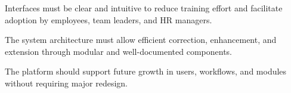   \vspace{6pt}


  {\fontsize{12}{18}\selectfont
  \setlength{\parindent}{1.2cm}
  \setlength{\parskip}{6pt}

  \indent Interfaces must be clear and intuitive to reduce training effort and facilitate adoption by employees, team leaders, and HR managers.

  }

  \vspace{6pt}


  {\fontsize{12}{18}\selectfont
  \setlength{\parindent}{1.2cm}
  \setlength{\parskip}{6pt}

  \indent The system architecture must allow efficient correction, enhancement, and extension through modular and well-documented components.

  }

  \vspace{6pt}


  {\fontsize{12}{18}\selectfont
  \setlength{\parindent}{1.2cm}
  \setlength{\parskip}{6pt}

  \indent The platform should support future growth in users, workflows, and modules without requiring major redesign.

  }

  \vspace{6pt}



  \newcommand{\storycard}[3]{%
    \begin{tikzpicture}
      \node[
        draw=#2,
        fill=#1,
        rounded corners=3mm,
        line width=0.35pt,
        inner sep=8pt,
        text width=0.27\textwidth,
        minimum height=3.7cm,
        align=left,
        anchor=north
      ] {\fontsize{10.5}{13}\selectfont #3};
    \end{tikzpicture}%
  }

